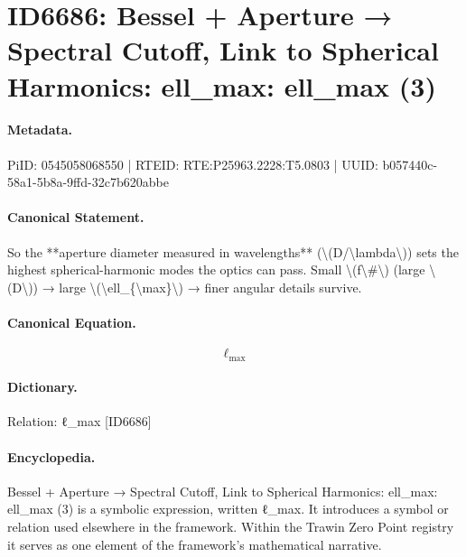 \section*{ID6686: Bessel + Aperture → Spectral Cutoff, Link to Spherical Harmonics: ell\_max: ell\_max (3)}
\paragraph{Metadata.}
PiID: 0545058068550 | RTEID: RTE:P25963.2228:T5.0803 | UUID: b057440c-58a1-5b8a-9ffd-32c7b620abbe

\paragraph{Canonical Statement.}
So the **aperture diameter measured in wavelengths** (\textbackslash{}(D/\textbackslash{}lambda\textbackslash{})) sets the highest spherical-harmonic modes the optics can pass. Small \textbackslash{}(f\textbackslash{}\#\textbackslash{}) (large \textbackslash{}(D\textbackslash{})) → large \textbackslash{}(\textbackslash{}ell\_\{\textbackslash{}max\}\textbackslash{}) → finer angular details survive.

\paragraph{Canonical Equation.}
\[
\ell_{\max}
\]

\paragraph{Dictionary.}
Relation: ℓ\_max [ID6686]

\paragraph{Encyclopedia.}
Bessel + Aperture → Spectral Cutoff, Link to Spherical Harmonics: ell\_max: ell\_max (3) is a symbolic expression, written ℓ\_max. It introduces a symbol or relation used elsewhere in the framework. Within the Trawin Zero Point registry it serves as one element of the framework's mathematical narrative.
